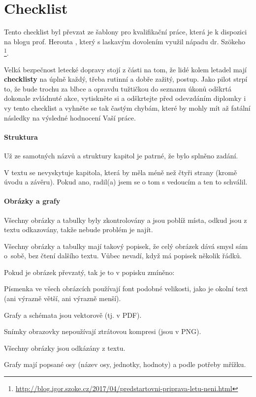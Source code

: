 \chapter{Checklist}
\label{checklist}
Tento checklist byl převzat ze šablony pro kvalifikační práce, která je k dispozici na blogu prof. Herouta \cite{Herout}, který s laskavým dovolením využil nápadu dr. Szökeho%
\footnote{\url{http://blog.igor.szoke.cz/2017/04/predstartovni-priprava-letu-neni.html}}.

Velká bezpečnost letecké dopravy stojí z části na tom, že lidé kolem letadel mají \textbf{checklisty} na úplně každý, třeba rutinní a dobře zažitý, postup. Jako pilot strpí to, že bude trochu za blbce a opravdu tužtičkou do seznamu úkonů odškrtá dokonale zvládnuté akce, vytiskněte si a odškrtejte před odevzdáním diplomky i vy tento checklist a vyhněte se tak častým chybám, které by mohly mít až fatální následky na výsledné hodnocení Vaší práce.

\subsubsection*{Struktura}
\begin{checklist}
	\item Už ze samotných názvů a struktury kapitol je patrné, že bylo splněno zadání.
	\item V textu se nevyskytuje kapitola, která by měla méně než čtyři strany (kromě úvodu a závěru). Pokud ano, radil(a) jsem se o tom s vedoucím a ten to schválil.
\end{checklist}

\subsubsection*{Obrázky a grafy}
\begin{checklist}
	\item Všechny obrázky a tabulky byly zkontrolovány a jsou poblíž místa, odkud jsou z textu odkazovány, takže nebude problém je najít.
	\item Všechny obrázky a tabulky mají takový popisek, že celý obrázek dává smysl sám o~sobě, bez čtení dalšího textu. Vůbec nevadí, když má popisek několik řádků.
	\item Pokud je obrázek převzatý, tak je to v popisku zmíněno: 
	\item Písmenka ve všech obrázcích používají font podobné velikosti, jako je okolní text (ani výrazně větší, ani výrazně menší).
	\item Grafy a schémata jsou vektorově (tj. v PDF).
	\item Snímky obrazovky nepoužívají ztrátovou kompresi (jsou v PNG).
	\item Všechny obrázky jsou odkázány z textu.
	\item Grafy mají popsané osy (název osy, jednotky, hodnoty) a podle potřeby mřížku.
\end{checklist}


